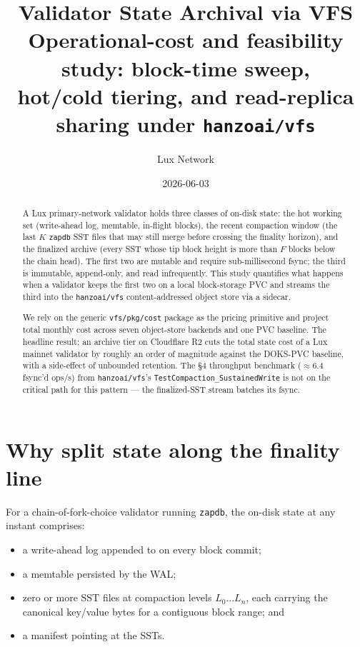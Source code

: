 \documentclass[11pt,a4paper]{article}
\title{Validator State Archival via VFS\\[4pt]
\large Operational-cost and feasibility study: block-time sweep,\\
hot/cold tiering, and read-replica sharing under \texttt{hanzoai/vfs}}
\author{Lux Network}
\date{2026-06-03}
\begin{document}
\maketitle

\begin{abstract}
A Lux primary-network validator holds three classes of on-disk state:
the hot working set (write-ahead log, memtable, in-flight blocks), the
recent compaction window (the last $K$ \texttt{zapdb} SST files that
may still merge before crossing the finality horizon), and the
finalized archive (every SST whose tip block height is more than $F$
blocks below the chain head). The first two are mutable and require
sub-millisecond fsync; the third is immutable, append-only, and read
infrequently. This study quantifies what happens when a validator
keeps the first two on a local block-storage PVC and streams the third
into the \texttt{hanzoai/vfs} content-addressed object store via a
sidecar.

We rely on the generic \texttt{vfs/pkg/cost} package as the pricing
primitive and project total monthly cost across seven object-store
backends and one PVC baseline. The headline result: an archive tier
on Cloudflare R2 cuts the total state cost of a Lux mainnet validator
by roughly an order of magnitude against the DOKS-PVC baseline, with
a side-effect of unbounded retention. The §4
throughput benchmark ($\approx 6.4$ fsync'd ops/s) from
\texttt{hanzoai/vfs}'s \texttt{TestCompaction\_SustainedWrite} is not
on the critical path for this pattern --- the finalized-SST stream
batches its fsync.
\end{abstract}

\section{Why split state along the finality line}

For a chain-of-fork-choice validator running \texttt{zapdb}, the
on-disk state at any instant comprises:

\begin{itemize}[noitemsep]
  \item a write-ahead log appended to on every block commit;
  \item a memtable persisted by the WAL;
  \item zero or more SST files at compaction levels $L_0 \ldots L_n$,
    each carrying the canonical key/value bytes for a contiguous block
    range; and
  \item a manifest pointing at the SSTs.
\end{itemize}
\end{document}
